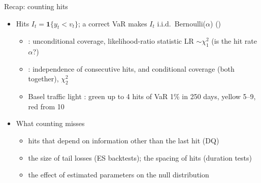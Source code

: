 \begin{frame}{Recap: counting hits}
\itemsize{\small}
\begin{itemize}
    \item Hits $I_t = \mathbf 1\{y_t < v_t\}$; a correct VaR makes $I_t$ i.i.d.\ Bernoulli($\alpha$) ()
    \begin{itemize}
        \item {}: unconditional coverage, likelihood-ratio statistic LR $\sim \chi^2_1$ (is the hit rate $\alpha$?)
        \item {}: independence of consecutive hits, and conditional coverage (both together), $\chi^2_2$
        \item Basel traffic light : green up to 4 hits of VaR 1\% in 250 days, yellow 5--9, red from 10
    \end{itemize}
    \item What counting misses
    \begin{itemize}
        \item hits that depend on information other than the last hit (DQ)
        \item the size of tail losses (ES backtests); the spacing of hits (duration tests)
        \item the effect of estimated parameters on the null distribution
    \end{itemize}
\end{itemize}
\end{frame}

